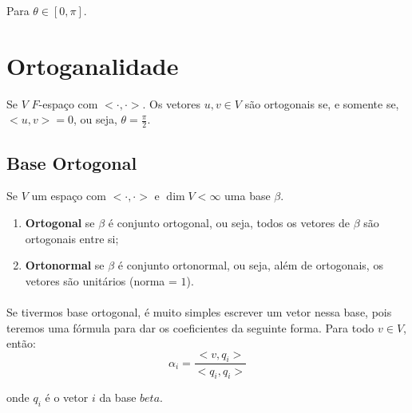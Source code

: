 \documentclass{article}
\newcommand{\interno}[0] {<\cdot, \cdot>}
\begin{document}
        Para $\theta \in [0, \pi]$.

    \section{Ortoganalidade}
        Se $V$ $F$-espaço com $\interno$. Os vetores $u, v \in V$ são ortogonais se, e somente se,
        $<u, v> = 0$, ou seja, $\theta = \frac{\pi}{2}$.

        \subsection{Base Ortogonal}
            Se $V$ um espaço com $\interno$ e $\dim V < \infty$ uma base $\beta$.
            
            \begin{enumerate}
                \item \textbf{Ortogonal} se $\beta$ é conjunto ortogonal, ou seja, todos os vetores de $\beta$
                    são ortogonais entre si;
                \item \textbf{Ortonormal} se $\beta$ é conjunto ortonormal, ou seja, além de ortogonais, os vetores
                    são unitários (norma = $1$).
            \end{enumerate}

            \paragraph{} Se tivermos base ortogonal, é muito simples escrever um vetor nessa base, pois teremos uma fórmula
            para dar os coeficientes da seguinte forma. Para todo $v \in V$, então:
            \[
                \alpha_i = \frac{<v, q_i>}{<q_i, q_i>}
            \]

            onde $q_i$ é o vetor $i$ da base $beta$.
\end{document}
